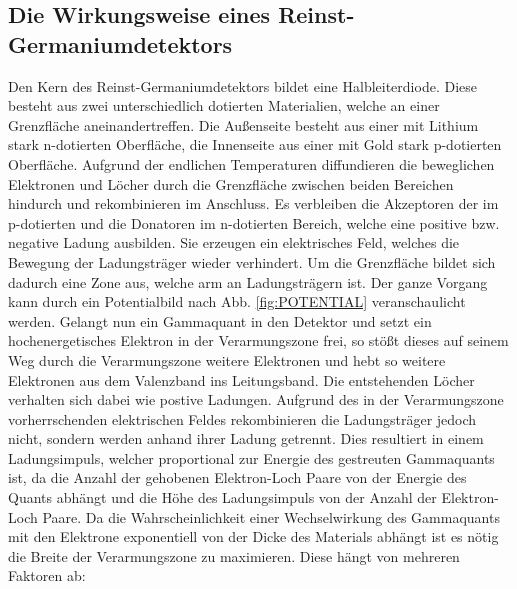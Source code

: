 \subsection{Die Wirkungsweise eines Reinst-Germaniumdetektors}
Den Kern des Reinst-Germaniumdetektors bildet eine Halbleiterdiode. Diese besteht aus zwei unterschiedlich dotierten Materialien, welche an einer Grenzfläche aneinandertreffen. Die Außenseite besteht aus einer mit Lithium stark n-dotierten Oberfläche, die Innenseite aus einer mit Gold stark p-dotierten Oberfläche. Aufgrund der endlichen Temperaturen diffundieren die beweglichen Elektronen und Löcher durch die Grenzfläche zwischen beiden Bereichen hindurch und rekombinieren im Anschluss. Es verbleiben die Akzeptoren der im p-dotierten und die Donatoren im n-dotierten Bereich, welche eine positive bzw. negative Ladung ausbilden. Sie erzeugen ein elektrisches Feld, welches die Bewegung der Ladungsträger wieder verhindert. Um die Grenzfläche bildet sich dadurch eine Zone aus, welche arm an Ladungsträgern ist. Der ganze Vorgang kann durch ein Potentialbild nach Abb. \ref{fig:POTENTIAL} veranschaulicht werden. Gelangt nun ein Gammaquant in den Detektor und setzt ein hochenergetisches Elektron in der Verarmungszone frei, so stößt dieses auf seinem Weg durch die Verarmungszone weitere Elektronen und hebt so weitere Elektronen aus dem Valenzband ins Leitungsband. Die entstehenden Löcher verhalten sich dabei wie postive Ladungen. Aufgrund des in der Verarmungszone vorherrschenden elektrischen Feldes rekombinieren die Ladungsträger jedoch nicht, sondern werden anhand ihrer Ladung getrennt. Dies resultiert in einem Ladungsimpuls, welcher proportional zur Energie des gestreuten Gammaquants ist, da die Anzahl der gehobenen Elektron-Loch Paare von der Energie des Quants abhängt und die Höhe des Ladungsimpuls von der Anzahl der Elektron-Loch Paare.
Da die Wahrscheinlichkeit einer Wechselwirkung des Gammaquants mit den Elektrone exponentiell von der Dicke des Materials abhängt ist es nötig die Breite der Verarmungszone zu maximieren. Diese hängt von mehreren Faktoren ab:
